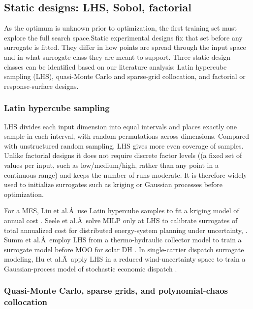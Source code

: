 \documentclass[final,5p,times,twocolumn]{elsarticle}
\begin{document}
\subsection{Static designs: LHS, Sobol, factorial}
\label{sec:doe:static}

As the optimum is unknown prior to optimization, the first training set
must explore the full search space.Static experimental designs fix that
set before any surrogate is fitted. They differ in how points are spread
through the input space and in what surrogate class they are meant to
support. Three static design classes can be identified based on our
literature analysis: Latin hypercube sampling (LHS), quasi-Monte Carlo
and sparse-grid collocation, and factorial or response-surface designs.

\subsubsection{Latin hypercube sampling}

LHS divides each input dimension into equal intervals and places exactly
one sample in each interval, with random permutations across dimensions.
Compared with unstructured random sampling, LHS gives more even coverage
of samples. Unlike factorial designs it does not require discrete factor
levels ((a fixed set of values per input, such as low/medium/high,
rather than any point in a continuous range) and keeps the number of
runs moderate. It is therefore widely used to initialize surrogates such
as kriging or Gaussian processes before optimization.

For a MES, Liu et al.Â~use Latin hypercube samples to fit a kriging model
of annual cost \cite{Liu201914569}. Seele et al.Â~solve MILP only at LHS to
calibrate surrogates of total annualized cost for distributed
energy-system planning under uncertainty, \cite{Seele20232480}. Summ et
al.Â~employ LHS from a thermo-hydraulic collector model to train a
surrogate model before MOO for solar DH \cite{Summ2025}. In single-carrier
dispatch surrogate modeling, Hu et al.Â~apply LHS in a reduced
wind-uncertainty space to train a Gaussian-process model of stochastic
economic dispatch \cite{Hu2021671}.

\subsubsection{Quasi-Monte Carlo, sparse grids, and polynomial-chaos collocation}
\end{document}
